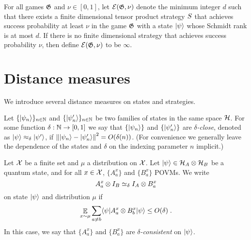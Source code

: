 \begin{definition}
  \label{def:ent}
	For all games $\mathfrak{G}$ and $\nu \in [0, 1]$, let $\mathcal{E}(\mathfrak{G}, \nu)$ denote the
  minimum integer $d$ such that there exists a finite dimensional tensor product
  strategy ${S}$ that achieves success probability at least $\nu$ in the
  game $\mathfrak{G}$ with a state $|\psi\rangle$ whose Schmidt rank is at most $d$.
  If there is no finite dimensional strategy that achieves success probability
  $\nu$, then define $\mathcal{E}(\mathfrak{G}, \nu)$ to be $\infty$.
\end{definition}

\section{Distance measures}
\label{section-distancemeasures}

We introduce several distance measures on states and strategies.

\begin{definition}
  \label{definition-state-distance}

	Let $\{|\psi_n\rangle\}_{n\in \mathbb{N}}$ and $\{|\psi'_n\rangle\}_{n\in \mathbb{N}}$ be two
  families of states in the same space $\mathcal{H}$.
  For some function $\delta : \mathbb{N} \to [0,1]$ we say that $\{ |\psi_n\rangle \}$ and
  $\{ |\psi'_n\rangle \}$ are \emph{$\delta$-close}, denoted as $|\psi\rangle
  \approx_\delta |\psi'\rangle$, if $ \left\| {|\psi_n\rangle - |\psi'_n\rangle} \right\|^2 =
  O(\delta(n))$.
  (For convenience we generally leave the dependence of the states and $\delta$
  on the indexing parameter $n$ implicit.)
\end{definition}

\begin{definition}
  \label{def:consistency}
	Let $\mathcal{X}$ be a finite set and $\mu$ a distribution on $\mathcal{X}$.
  Let $|\psi\rangle \in \mathcal{H}_A \otimes \mathcal{H}_B$ be a quantum state, and for
  all $x\in \mathcal{X}$, $\{A^x_a\}$ and $\{B^x_a\}$ POVMs.
  We write
  \begin{equation*}
    A^x_a \otimes I_B \simeq_\delta I_A \otimes B^x_a
  \end{equation*}
  on state $|\psi\rangle$ and distribution $\mu$ if
  \begin{equation*}
    \mathop{\mathbb{E}}\displaylimits_{x\sim \mu} \sum_{a\ne b} \langle\psi| A^x_a \otimes B^x_b |\psi\rangle
    \leq O(\delta)\;.
  \end{equation*}
  In this case, we say that $\{A^x_a\}$ and $\{B^x_a\}$ are
  \emph{$\delta$-consistent} on $|\psi\rangle$.
\end{definition}

